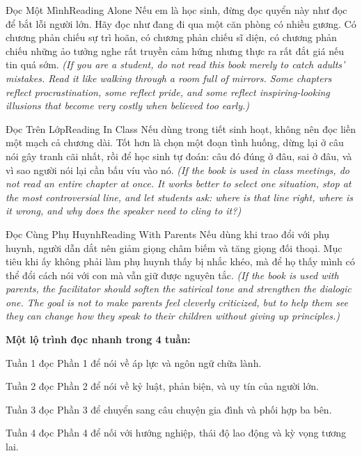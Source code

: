 \begin{truyen}{Đọc Một Mình}{Reading Alone}
Nếu em là học sinh, đừng đọc quyển này như đọc để bắt lỗi người lớn. Hãy đọc như đang đi qua một căn phòng có nhiều gương. Có chương phản chiếu sự trì hoãn, có chương phản chiếu sĩ diện, có chương phản chiếu những ảo tưởng nghe rất truyền cảm hứng nhưng thực ra rất đắt giá nếu tin quá sớm.
\textit{(If you are a student, do not read this book merely to catch adults' mistakes. Read it like walking through a room full of mirrors. Some chapters reflect procrastination, some reflect pride, and some reflect inspiring-looking illusions that become very costly when believed too early.)}
\end{truyen}

\begin{truyen}{Đọc Trên Lớp}{Reading In Class}
Nếu dùng trong tiết sinh hoạt, không nên đọc liền một mạch cả chương dài. Tốt hơn là chọn một đoạn tình huống, dừng lại ở câu nói gây tranh cãi nhất, rồi để học sinh tự đoán: câu đó đúng ở đâu, sai ở đâu, và vì sao người nói lại cần bấu víu vào nó.
\textit{(If the book is used in class meetings, do not read an entire chapter at once. It works better to select one situation, stop at the most controversial line, and let students ask: where is that line right, where is it wrong, and why does the speaker need to cling to it?) }
\end{truyen}

\begin{truyen}{Đọc Cùng Phụ Huynh}{Reading With Parents}
Nếu dùng khi trao đổi với phụ huynh, người dẫn dắt nên giảm giọng châm biếm và tăng giọng đối thoại. Mục tiêu khi ấy không phải làm phụ huynh thấy bị nhắc khéo, mà để họ thấy mình có thể đổi cách nói với con mà vẫn giữ được nguyên tắc.
\textit{(If the book is used with parents, the facilitator should soften the satirical tone and strengthen the dialogic one. The goal is not to make parents feel cleverly criticized, but to help them see they can change how they speak to their children without giving up principles.)}
\end{truyen}

\begin{goigiaovien}
\textbf{Một lộ trình đọc nhanh trong 4 tuần:}

Tuần 1 đọc Phần 1 để nói về áp lực và ngôn ngữ chữa lành.

Tuần 2 đọc Phần 2 để nói về kỷ luật, phản biện, và uy tín của người lớn.

Tuần 3 đọc Phần 3 để chuyển sang câu chuyện gia đình và phối hợp ba bên.

Tuần 4 đọc Phần 4 để nối với hướng nghiệp, thái độ lao động và kỳ vọng tương lai.
\end{goigiaovien}

